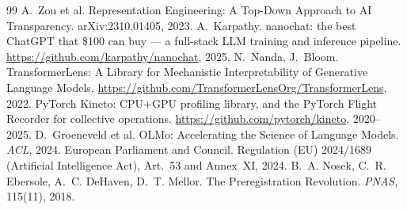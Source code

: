 \documentclass[10pt,twocolumn]{article}
\begin{document}
\begin{thebibliography}{99}
 A.~Zou et al. Representation Engineering: A Top-Down Approach to AI Transparency. arXiv:2310.01405, 2023.
 A.~Karpathy. nanochat: the best ChatGPT that \$100 can buy --- a full-stack LLM training and inference pipeline. \url{https://github.com/karpathy/nanochat}, 2025.
 N.~Nanda, J.~Bloom. TransformerLens: A Library for Mechanistic Interpretability of Generative Language Models. \url{https://github.com/TransformerLensOrg/TransformerLens}, 2022.
 PyTorch Kineto: CPU+GPU profiling library, and the PyTorch Flight Recorder for collective operations. \url{https://github.com/pytorch/kineto}, 2020--2025.
 D.~Groeneveld et al. OLMo: Accelerating the Science of Language Models. \emph{ACL}, 2024.
 European Parliament and Council. Regulation (EU) 2024/1689 (Artificial Intelligence Act), Art.~53 and Annex~XI, 2024.
 B.~A. Nosek, C.~R. Ebersole, A.~C. DeHaven, D.~T. Mellor. The Preregistration Revolution. \emph{PNAS}, 115(11), 2018.
\end{thebibliography}
\end{document}
